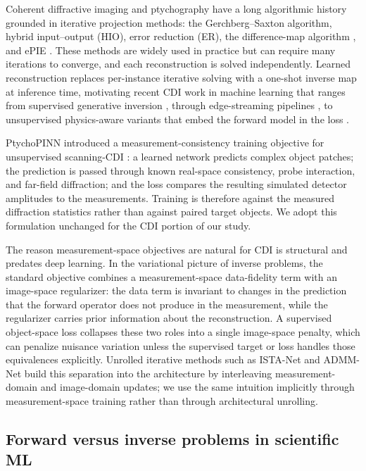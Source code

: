 \documentclass[11pt]{article}
\begin{document}
Coherent diffractive imaging and ptychography have a long algorithmic history
grounded in iterative projection methods: the Gerchberg--Saxton algorithm,
hybrid input--output (HIO), error reduction (ER), the difference-map algorithm
\cite{fienup}, and ePIE \cite{epie}. These methods are widely used in practice
but can require many iterations to converge, and each reconstruction is solved
independently. Learned reconstruction replaces per-instance iterative solving
with a one-shot inverse map at inference time, motivating recent CDI work in
machine learning that ranges from supervised generative inversion
\cite{cherukara2018,ptychonn}, through edge-streaming pipelines
\cite{streamingptycho}, to unsupervised physics-aware variants that embed the
forward model in the loss \cite{autophasenn,hoidn2023physics}.

PtychoPINN introduced a measurement-consistency training objective for
unsupervised scanning-CDI \cite{hoidn2023physics}: a learned network predicts
complex object patches; the prediction is passed through known real-space
consistency, probe interaction, and far-field diffraction; and the loss
compares the resulting simulated detector amplitudes to the measurements.
Training is therefore against the measured diffraction statistics rather than
against paired target objects. We adopt this formulation unchanged for the CDI
portion of our study.

The reason measurement-space objectives are natural for CDI is structural and
predates deep learning. In the variational picture of inverse problems, the
standard objective combines a measurement-space data-fidelity term with an
image-space regularizer: the data term is invariant to changes in the
prediction that the forward operator does not produce in the measurement,
while the regularizer carries prior information about the reconstruction. A
supervised object-space loss collapses these two roles into a single
image-space penalty, which can penalize nuisance variation unless the
supervised target or loss handles those equivalences explicitly. Unrolled
iterative methods such as ISTA-Net and ADMM-Net build this separation into the
architecture by interleaving measurement-domain and image-domain updates; we
use the same intuition implicitly through measurement-space training rather
than through architectural unrolling.

\subsection{Forward versus inverse problems in scientific ML}
\end{document}
